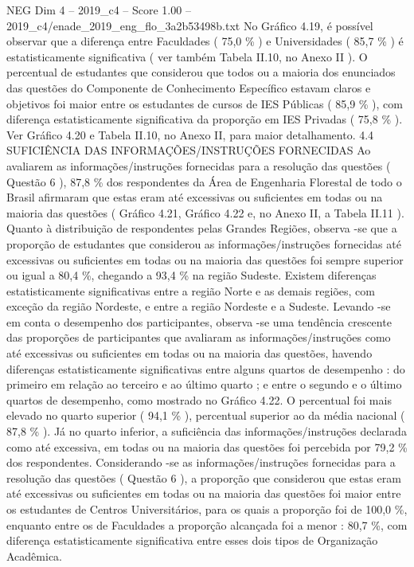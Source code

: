 \begin{textsample}{NEG Dim 4 – 2019\_c4 – Score 1.00 – 2019\_c4/enade\_2019\_eng\_flo\_3a2b53498b.txt}
No Gráfico 4.19, é possível observar que a diferença entre Faculdades ( 75,0 \% ) e Universidades ( 85,7 \% ) é estatisticamente significativa ( ver também Tabela II.10, no Anexo II ).
O percentual de estudantes que considerou que todos ou a maioria dos enunciados das questões do Componente de Conhecimento Específico estavam claros e objetivos foi maior entre os estudantes de cursos de IES Públicas ( 85,9 \% ), com diferença estatisticamente significativa da proporção em IES Privadas ( 75,8 \% ).
Ver Gráfico 4.20 e Tabela II.10, no Anexo II, para maior detalhamento. 4.4 SUFICIÊNCIA DAS INFORMAÇÕES/INSTRUÇÕES FORNECIDAS Ao avaliarem as informações/instruções fornecidas para a resolução das questões ( Questão 6 ), 87,8 \% dos respondentes da Área de Engenharia Florestal de todo o Brasil afirmaram que estas eram até excessivas ou suficientes em todas ou na maioria das questões ( Gráfico 4.21, Gráfico 4.22 e, no Anexo II, a Tabela II.11 ).
Quanto à distribuição de respondentes pelas Grandes Regiões, observa -se que a proporção de estudantes que considerou as informações/instruções fornecidas até excessivas ou suficientes em todas ou na maioria das questões foi sempre superior ou igual a 80,4 \%, chegando a 93,4 \% na região Sudeste.
Existem diferenças estatisticamente significativas entre a região Norte e as demais regiões, com exceção da região Nordeste, e entre a região Nordeste e a Sudeste.
Levando -se em conta o desempenho dos participantes, observa -se uma tendência crescente das proporções de participantes que avaliaram as informações/instruções como até excessivas ou suficientes em todas ou na maioria das questões, havendo diferenças estatisticamente significativas entre alguns quartos de desempenho : do primeiro em relação ao terceiro e ao último quarto ; e entre o segundo e o último quartos de desempenho, como mostrado no Gráfico 4.22.
O percentual foi mais elevado no quarto superior ( 94,1 \% ), percentual superior ao da média nacional ( 87,8 \% ).
Já no quarto inferior, a suficiência das informações/instruções declarada como até excessiva, em todas ou na maioria das questões foi percebida por 79,2 \% dos respondentes.
Considerando -se as informações/instruções fornecidas para a resolução das questões ( Questão 6 ), a proporção que considerou que estas eram até excessivas ou suficientes em todas ou na maioria das questões foi maior entre os estudantes de Centros Universitários, para os quais a proporção foi de 100,0 \%, enquanto entre os de Faculdades a proporção alcançada foi a menor : 80,7 \%, com diferença estatisticamente significativa entre esses dois tipos de Organização Acadêmica.

\end{textsample}

